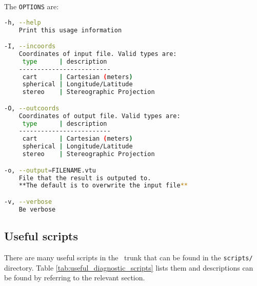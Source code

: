 The \lstinline[language = Bash]+OPTIONS+ are:
\begin{lstlisting}[language = Bash]
-h, --help
	Print this usage information

-I, --incoords
	Coordinates of input file. Valid types are:
	 type      | description 
	-------------------------
	 cart      | Cartesian (meters)
	 spherical | Longitude/Latitude
	 stereo    | Stereographic Projection

-O, --outcoords
	Coordinates of output file. Valid types are:
	 type      | description 
	-------------------------
	 cart      | Cartesian (meters)
	 spherical | Longitude/Latitude
	 stereo    | Stereographic Projection

-o, --output=FILENAME.vtu
	File that the result is outputed to. 
	**The default is to overwrite the input file**

-v, --verbose
	Be verbose

\end{lstlisting}


\subsection{Useful scripts}
\label{sect:diagnostics_useful_scripts}

There are many useful scripts in the \fluidity\ trunk that can be found in the \lstinline[language = bash]+scripts/+ directory. Table \ref{tab:useful_diagnostic_scripts} lists them and descriptions can be found by referring to the relevant section.


